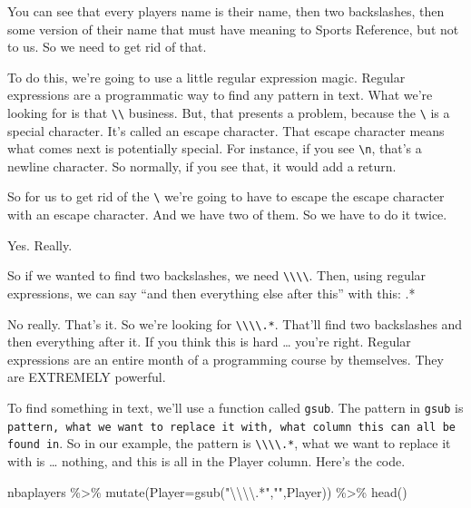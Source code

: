 \documentclass[
]{book}
\newenvironment{Shaded}{\begin{snugshade}}{\end{snugshade}}
\newcommand{\AttributeTok}[1]{\textcolor[rgb]{0.77,0.63,0.00}{#1}}
\newcommand{\FunctionTok}[1]{\textcolor[rgb]{0.00,0.00,0.00}{#1}}
\newcommand{\NormalTok}[1]{#1}
\newcommand{\SpecialCharTok}[1]{\textcolor[rgb]{0.00,0.00,0.00}{#1}}
\newcommand{\StringTok}[1]{\textcolor[rgb]{0.31,0.60,0.02}{#1}}
\begin{document}
You can see that every players name is their name, then two backslashes, then some version of their name that must have meaning to Sports Reference, but not to us. So we need to get rid of that.

To do this, we're going to use a little regular expression magic. Regular expressions are a programmatic way to find any pattern in text. What we're looking for is that \texttt{\textbackslash{}\textbackslash{}} business. But, that presents a problem, because the \texttt{\textbackslash{}} is a special character. It's called an escape character. That escape character means what comes next is potentially special. For instance, if you see \texttt{\textbackslash{}n}, that's a newline character. So normally, if you see that, it would add a return.

So for us to get rid of the \texttt{\textbackslash{}} we're going to have to escape the escape character with an escape character. And we have two of them. So we have to do it twice.

Yes. Really.

So if we wanted to find two backslashes, we need \texttt{\textbackslash{}\textbackslash{}\textbackslash{}\textbackslash{}}. Then, using regular expressions, we can say ``and then everything else after this'' with this: .*

No really. That's it. So we're looking for \texttt{\textbackslash{}\textbackslash{}\textbackslash{}\textbackslash{}.*}. That'll find two backslashes and then everything after it. If you think this is hard \ldots{} you're right. Regular expressions are an entire month of a programming course by themselves. They are EXTREMELY powerful.

To find something in text, we'll use a function called \texttt{gsub}. The pattern in \texttt{gsub} is \texttt{pattern,\ what\ we\ want\ to\ replace\ it\ with,\ what\ column\ this\ can\ all\ be\ found\ in}. So in our example, the pattern is \texttt{\textbackslash{}\textbackslash{}\textbackslash{}\textbackslash{}.*}, what we want to replace it with is \ldots{} nothing, and this is all in the Player column. Here's the code.

\begin{Shaded}
\begin{Highlighting}[]
\NormalTok{nbaplayers }\SpecialCharTok{\%\textgreater{}\%} \FunctionTok{mutate}\NormalTok{(}\AttributeTok{Player=}\FunctionTok{gsub}\NormalTok{(}\StringTok{"}\SpecialCharTok{\textbackslash{}\textbackslash{}\textbackslash{}\textbackslash{}}\StringTok{.*"}\NormalTok{,}\StringTok{""}\NormalTok{,Player)) }\SpecialCharTok{\%\textgreater{}\%} \FunctionTok{head}\NormalTok{()}
\end{Highlighting}
\end{Shaded}
\end{document}
